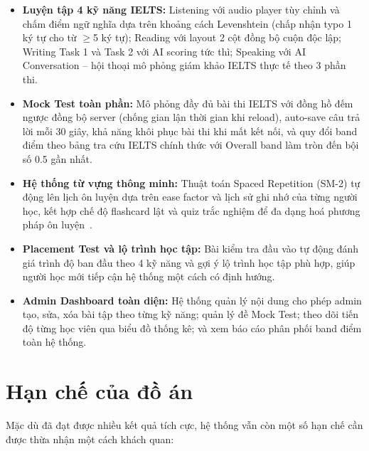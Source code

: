 \documentclass[a4paper,12pt]{extreport}
\begin{document}
\begin{itemize}
    \item \textbf{Luyện tập 4 kỹ năng IELTS:} Listening với audio player tùy chỉnh và chấm điểm ngữ nghĩa dựa trên khoảng cách Levenshtein (chấp nhận typo 1 ký tự cho từ $\geq$5 ký tự); Reading với layout 2 cột đồng bộ cuộn độc lập; Writing Task 1 và Task 2 với AI scoring tức thì; Speaking với AI Conversation -- hội thoại mô phỏng giám khảo IELTS thực tế theo 3 phần thi.

    \item \textbf{Mock Test toàn phần:} Mô phỏng đầy đủ bài thi IELTS với đồng hồ đếm ngược đồng bộ server (chống gian lận thời gian khi reload), auto-save câu trả lời mỗi 30 giây, khả năng khôi phục bài thi khi mất kết nối, và quy đổi band điểm theo bảng tra cứu IELTS chính thức với Overall band làm tròn đến bội số 0.5 gần nhất.

    \item \textbf{Hệ thống từ vựng thông minh:} Thuật toán Spaced Repetition (SM-2) tự động lên lịch ôn luyện dựa trên ease factor và lịch sử ghi nhớ của từng người học, kết hợp chế độ flashcard lật và quiz trắc nghiệm để đa dạng hoá phương pháp ôn luyện~\cite{wozniak1990spaced}.

    \item \textbf{Placement Test và lộ trình học tập:} Bài kiểm tra đầu vào tự động đánh giá trình độ ban đầu theo 4 kỹ năng và gợi ý lộ trình học tập phù hợp, giúp người học mới tiếp cận hệ thống một cách có định hướng.

    \item \textbf{Admin Dashboard toàn diện:} Hệ thống quản lý nội dung cho phép admin tạo, sửa, xóa bài tập theo từng kỹ năng; quản lý đề Mock Test; theo dõi tiến độ từng học viên qua biểu đồ thống kê; và xem báo cáo phân phối band điểm toàn hệ thống.
\end{itemize}

\section{Hạn chế của đồ án}

Mặc dù đã đạt được nhiều kết quả tích cực, hệ thống vẫn còn một số hạn chế cần được thừa nhận một cách khách quan:
\end{document}
